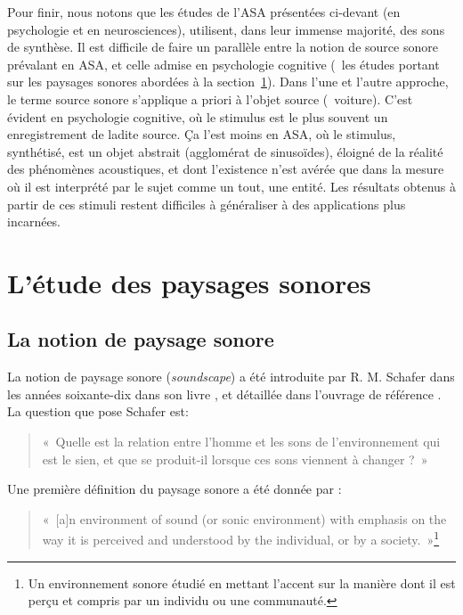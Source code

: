 Pour finir, nous notons que les études de l'ASA présentées ci-devant (en psychologie et en neurosciences), utilisent, dans leur immense majorité, des sons de synthèse. Il est difficile de faire un parallèle entre la notion de source sonore prévalant en ASA, et celle admise en psychologie cognitive (\cf~les études portant sur les paysages sonores abordées à la section~\ref{sec:ch3_paysageSonore}). Dans l'une et l'autre approche, le terme source sonore s'applique a priori à l'objet source (\eg~voiture). C'est évident en psychologie cognitive, où le stimulus est le plus souvent un enregistrement de ladite source. Ça l'est moins en ASA, où le stimulus, synthétisé, est un objet abstrait (agglomérat de sinusoïdes), éloigné de la réalité des phénomènes acoustiques, et dont l'existence n'est avérée que dans la mesure où il est interprété par le sujet comme un tout, une entité. Les résultats obtenus à partir de ces stimuli restent difficiles à généraliser à des applications plus incarnées.

\section{L'étude des paysages sonores}
\label{sec:ch3_paysageSonore}

\subsection{La notion de paysage sonore}

La notion de paysage sonore (\emph{soundscape}) a été introduite par R. M. Schafer dans les années soixante-dix dans son livre \citep{schafer1969new}, et détaillée dans l'ouvrage de référence \citep{schafer1977tuning}. La question que pose Schafer est:

\begin{quote}
«~Quelle est la relation entre l'homme et les sons de l'environnement qui est le sien, et que se produit-il lorsque ces sons viennent à changer ?~»
\end{quote}

Une première définition du paysage sonore a été donnée par \citep{truax1978handbook}:

\begin{quote}
«~[a]n environment of sound (or sonic environment) with emphasis on the way it is perceived and understood by the individual, or by a society.~»\footnote{Un environnement sonore étudié en mettant l'accent sur la manière dont il est perçu et compris par un individu ou une communauté.}
\end{quote}


